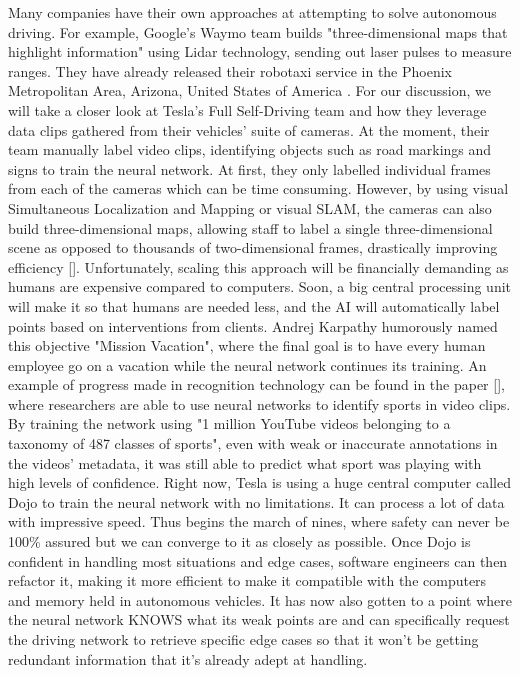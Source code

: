 \documentclass{article}
\begin{document}
Many companies have their own approaches at attempting to solve autonomous driving. For example, Google's Waymo team builds "three-dimensional maps that highlight information" using Lidar technology, sending out laser pulses to measure ranges. They have already released their robotaxi service in the Phoenix Metropolitan Area, Arizona, United States of America \textcite{waymo}. For our discussion, we will take a closer look at Tesla's Full Self-Driving team and how they leverage data clips gathered from their vehicles' suite of cameras. At the moment, their team manually label video clips, identifying objects such as road markings and signs to train the neural network. At first, they only labelled individual frames from each of the cameras which can be time consuming. However, by using visual Simultaneous Localization and Mapping or visual SLAM, the cameras can also build three-dimensional maps, allowing staff to label a single three-dimensional scene as opposed to thousands of two-dimensional frames, drastically improving efficiency [\textcite{durrant2006simultaneous}].
\bigbreak
Unfortunately, scaling this approach will be financially demanding as humans are expensive compared to computers. Soon, a big central processing unit will make it so that humans are needed less, and the AI will automatically label points based on interventions from clients. Andrej Karpathy humorously named this objective "Mission Vacation", where the final goal is to have every human employee go on a vacation while the neural network continues its training. An example of progress made in recognition technology can be found in the paper [\textcite{karpathy2014large}], where researchers are able to use neural networks to identify sports in video clips. By training the network using "1 million YouTube videos belonging to a taxonomy of 487 classes of sports", even with weak or inaccurate annotations in the videos' metadata, it was still able to predict what sport was playing with high levels of confidence.
\bigbreak
Right now, Tesla is using a huge central computer called Dojo to train the neural network with no limitations. It can process a lot of data with impressive speed. Thus begins the march of nines, where safety can never be 100\% assured but we can converge to it as closely as possible. Once Dojo is confident in handling most situations and edge cases, software engineers can then refactor it, making it more efficient to make it compatible with the computers and memory held in autonomous vehicles. It has now also gotten to a point where the neural network KNOWS what its weak points are and can specifically request the driving network to retrieve specific edge cases so that it won’t be getting redundant information that it’s already adept at handling. 
\end{document}
